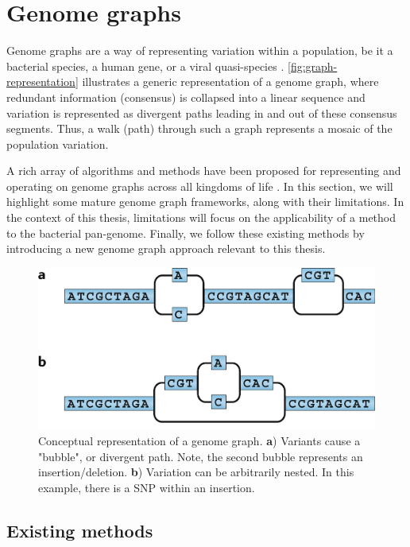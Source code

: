 \section{Genome graphs}

Genome graphs are a way of representing variation within a population, be it a bacterial species, a human gene, or a viral quasi-species \cite{comp-pan-genomics}. \autoref{fig:graph-representation} illustrates a generic representation of a genome graph, where redundant information (consensus) is collapsed into a linear sequence and variation is represented as divergent paths leading in and out of these consensus segments. Thus, a walk (path) through such a graph represents a mosaic of the population variation. 

A rich array of algorithms and methods have been proposed for representing and operating on genome graphs across all kingdoms of life \cite{Sherman2020,Eizenga2020,comp-pan-genomics}. In this section, we will highlight some mature genome graph frameworks, along with their limitations. In the context of this thesis, limitations will focus on the applicability of a method to the bacterial pan-genome. Finally, we follow these existing methods by introducing a new genome graph approach relevant to this thesis.

\begin{figure}
\centering
\includegraphics[width=0.75\columnwidth]{Chapter0/Figs/graph-representation.png}
\caption{Conceptual representation of a genome graph. \textbf{a}) Variants cause a "bubble", or divergent path. Note, the second bubble represents an insertion/deletion. \textbf{b}) Variation can be arbitrarily nested. In this example, there is a SNP within an insertion.}
\label{fig:graph-representation}
\end{figure}

\subsection{Existing methods}
\label{sec:graphs-existing}

